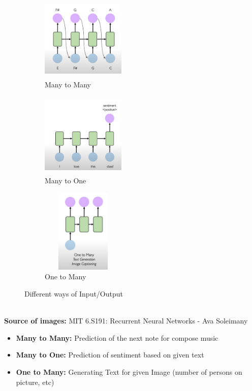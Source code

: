 \documentclass[12pt]{article}
\begin{document}
\begin{figure}[H]

    \begin{subfigure}[t]{0.3\linewidth}
    \includegraphics[width=4cm, height=4cm]{images/many_to_many.png}
    \caption{Many to Many}
        
    \end{subfigure}
    \begin{subfigure}[t]{0.3\linewidth}
    \includegraphics[width=4cm, height=4cm]{images/many_to_one.png}
    \caption{Many to One}

    \end{subfigure}
    \begin{subfigure}[t]{0.3\linewidth}
    \includegraphics[width=4cm, height=4cm]{images/one_to_many.png}
    \caption{One to Many}

    \end{subfigure}
    \caption{Different ways of Input/Output}
\end{figure}
\mbox{} \\
\textbf{Source of images:} MIT 6.S191: Recurrent Neural Networks - Ava Soleimany

\begin{itemize}
    \item \textbf{Many to Many:} Prediction of the next note for compose music
    \item \textbf{Many to One:} Prediction of sentiment based on given text
    \item \textbf{One to Many:} Generating Text for given Image (number of persons on picture, etc)

\end{itemize}
\end{document}
